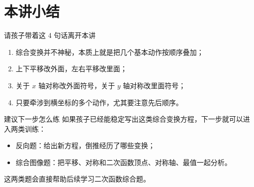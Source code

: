 \documentclass[11pt,a4paper,fontset=fandol]{ctexart}
\theoremstyle{formaltheorem}
\theoremstyle{formalexample}
\begin{document}
\section{本讲小结}

\begin{goalbox}{请孩子带着这 4 句话离开本讲}
\begin{enumerate}
  \item 综合变换并不神秘，本质上就是把几个基本动作按顺序叠加；
  \item 上下平移改外面，左右平移改里面；
  \item 关于 \(x\) 轴对称改外面符号，关于 \(y\) 轴对称改里面符号；
  \item 只要牵涉到横坐标的多个动作，尤其要注意先后顺序。
\end{enumerate}
\end{goalbox}

\begin{skillbox}{建议下一步怎么练}
如果孩子已经能稳定写出这类综合变换方程，下一步就可以进入两类训练：
\begin{itemize}
  \item 反向题：给出新方程，倒推经历了哪些变换；
  \item 综合图像题：把平移、对称和二次函数顶点、对称轴、最值一起分析。
\end{itemize}
这两类题会直接帮助后续学习二次函数综合题。
\end{skillbox}
\end{document}
